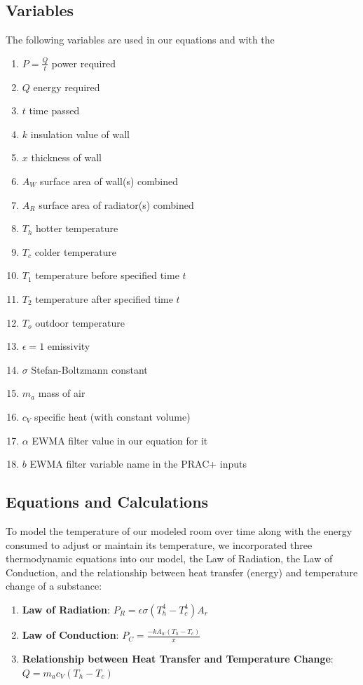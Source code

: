 \documentclass[conference,letterpaper]{IEEEtran}
\begin{document}
\subsection{Variables}
The following variables are used in our equations and with the 
\begin{enumerate}
    \item $P = \frac{Q}{t}$ power required
\item $Q$ energy required
\item $t$ time passed
\item $k$ insulation value of wall
\item $x$ thickness of wall
\item $A_W$ surface area of wall(s) combined
\item $A_R$ surface area of radiator(s) combined
\item $T_h$ hotter temperature
\item $T_c$ colder temperature
\item $T_1$ temperature before specified time $t$
\item $T_2$ temperature after specified time $t$
\item $T_o$ outdoor temperature
\item $\epsilon = 1$ emissivity
\item $\sigma$ Stefan-Boltzmann constant
\item $m_a$ mass of air
\item $c_V$ specific heat (with constant volume)
\item $\alpha$ EWMA filter value in our equation for it
\item $b$ EWMA filter variable name in the PRAC+ inputs
\end{enumerate}

\subsection{Equations and Calculations}
\label{sec:Equations}
To model the temperature of our modeled room over time along with the energy consumed to adjust or maintain its temperature, we incorporated three thermodynamic equations into our model, the Law of Radiation, the Law of Conduction, and the relationship between heat transfer (energy) and temperature change of a substance: 

\begin{enumerate}
    \item \textbf{Law of Radiation}: $P_R=\epsilon\sigma(T_h^4-T_c^4)A_r$
    \item \textbf{Law of Conduction}: $P_C=\frac{-kA_w(T_h-T_c)}{x}$
    \item \textbf{Relationship between Heat Transfer and Temperature Change}: $Q=m_ac_V(T_h-T_c)$
\end{enumerate}
\end{document}
